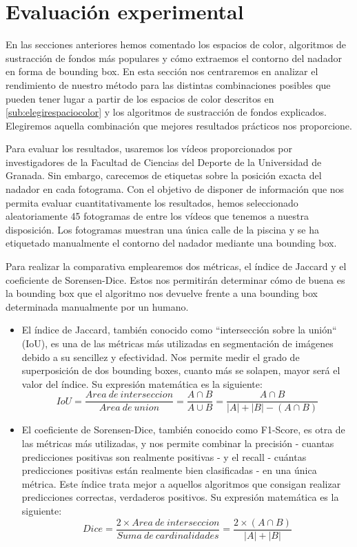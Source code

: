 \section{Evaluación experimental} \label{sub:eleccionalgoritmo}

En las secciones anteriores hemos comentado los espacios de color, algoritmos de sustracción de fondos más populares y cómo extraemos el contorno del nadador en forma de bounding box. En esta sección nos centraremos en analizar el rendimiento de nuestro método para las distintas combinaciones posibles que pueden tener lugar a partir de los espacios de color descritos en \ref{sub:elegirespaciocolor} y los algoritmos de sustracción de fondos explicados. Elegiremos aquella combinación que mejores resultados prácticos nos proporcione.

Para evaluar los resultados, usaremos los vídeos proporcionados por investigadores de la Facultad de Ciencias del Deporte de la Universidad de Granada. Sin embargo, carecemos de etiquetas sobre la posición exacta del nadador en cada fotograma. Con el objetivo de disponer de información que nos permita evaluar cuantitativamente los resultados, hemos seleccionado aleatoriamente 45 fotogramas de entre los vídeos que tenemos a nuestra disposición. Los fotogramas muestran una única calle de la piscina y se ha etiquetado manualmente el contorno del nadador mediante una bounding box.

Para realizar la comparativa emplearemos dos métricas, el índice de Jaccard y el coeficiente de Sorensen-Dice. Estos nos permitirán determinar cómo de buena es la bounding box que el algoritmo nos devuelve frente a una bounding box determinada manualmente por un humano.

\begin{itemize}
    \item El índice de Jaccard, también conocido como ``intersección sobre la unión`` (IoU), es una de las métricas más utilizadas en segmentación de imágenes debido a su sencillez y efectividad. Nos permite medir el grado de superposición de dos bounding boxes, cuanto más se solapen, mayor será el valor del índice. Su expresión matemática es la siguiente: 
    \begin{equation}
        IoU= \frac{Area\ de\ interseccion}{Area\ de\ union} = \frac{A \cap B}{A \cup B}=\frac{A\cap B}{|A|+|B|-(A \cap B)}
    \end{equation}
    \item El coeficiente de Sorensen-Dice, también conocido como F1-Score, es otra de las métricas más utilizadas, y nos permite combinar la precisión - cuantas predicciones positivas son realmente positivas - y el recall - cuántas predicciones positivas están realmente bien clasificadas - en una única métrica. Este índice trata mejor a aquellos algoritmos que consigan realizar predicciones correctas, verdaderos positivos. Su expresión matemática es la siguiente: 
    \begin{equation}
        Dice = \frac{2 \times Area\ de\ interseccion}{Suma\ de\ cardinalidades} = \frac{2 \times (A \cap B)}{|A| + |B|}
    \end{equation}
\end{itemize}

